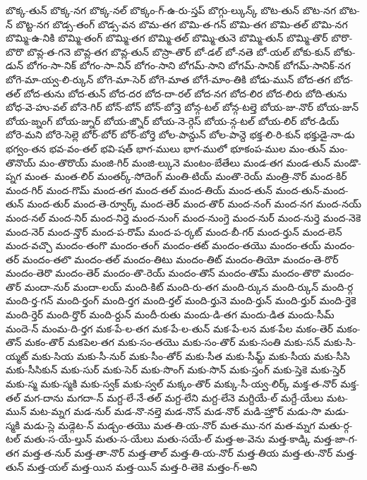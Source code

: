 {బొక్క-తున్
బొక్క-నగ
బొక్క-నల్
బొక్కం-గ్-ఉ-రు-స్తప్
బొగ్గు-ల్కున్క్
బొట-తున్
బొట-నగ
బొట-న్
బొట్ట-నగ
బొడ్స-తంగ్
బొడ్స-వన
బొమ-తగ
బొమి-త-గన్
బొమి-తగ
బొమి-తల్
బొమి-నగ
బొమ్మి-ఉ-నికి
బొమ్మి-తంగ్
బొమ్మి-తగ
బొమ్మి-తల్
బొమ్మి-తునె
బొమ్మి-తున్
బొమ్మి-తొర్
బొరొ-బొరొ
బొవ్ల-త-గనె
బొవ్ల-తగ
బొవ్ల-తున్
బొస్రా-తొర్
బో-డల్
బో-నతె
బో-యల్
బోకు-కున్
బోకు-డున్
బోగం-సా-నిక్
బోగం-సా-నిన్
బోగం-సాని
బోగమ్-సాని
బోగమ్-సానిక్
బోగమ్-సానిక్-నగ
బోగె-మా-య్వ-లి-ర్కున్
బోగె-మా-సెర్
బోగె-మాత
బోగే-మాం-తికి
బోడు-మున్
బోద-తగ
బోద-తల్
బోద-తును
బోద-తున్
బోద-దర
బోద-దా-రల్
బోద-నగ
బోద-లిర
బోద-లిరు
బోది-తును
బోధ-వె-హు-వల్
బోనె-గిర్
బోన్-బోన్
బోన్-బోన్తె
బోన్గ-టల్
బోన్గ-టల్తె
బోయ-జు-నొర్
బోయ-జున్
బోయ-జ్నంగ్
బోయ-జ్నుర్
బోయ-జ్నొర్
బోయ-నె-ర్గెస్
బోయ-న్గ-టల్
బోయ-లిర్
బోర-డియ్
బోరె-మని
బోరె-సెల్లె
బోర్-బోర్
బోర్-బోర్తె
బోల-పాన్దున్
బోల-పాన్దె
భక్త-లి-రి-కున్
భక్తుడై-నా-డు
భగ్వం-తన
భవ-వం-తల్
భవి-షత్
భాగ-ములు
భాగ-ములో
భూకంప-ముల
మం-తున్
మం-తొనొయ్
మం-తొరొయ్
మంజి-గిర్
మంజి-ల్కునె
మంటం-బేతేలు
మండ-తగ
మండ-తున్
మండొ-ప్నగ
మంత-
మంత-లిర్
మంతర్క్-సోదెంగ్
మంతి-టియ్
మంతొ-రెయ్
మంత్రి-నొర్
మంద-కిర్
మంద-గిర్
మంద-గొమ్
మంద-తగ
మంద-తల్
మంద-తియ్
మంద-తున్
మంద-తున్-మంద-తున్
మంద-తుర్
మంద-తె-ర్వూర్క్
మంద-తెర్
మంద-తొర్
మంద-నంగ్
మంద-నగ
మంద-నయ్
మంద-నల్
మంద-నిర్
మంద-నిర్తె
మంద-నుంగ్
మంద-నుంగ్తె
మంద-నుర్
మంద-నుర్తె
మంద-నెకె
మంద-నెర్
మంద-న్తొర్
మంద-ప-రొమ్
మంద-ప-ర్కట్
మంద-బీ-గర్
మంద-ర్తున్
మంద-లెన్
మంద-వచ్చొ
మందం-తంగొ
మందం-తంగ్
మందం-తట్
మందం-తయొ
మందం-తయ్
మందం-తర్
మందం-తలొ
మందం-తల్
మందం-తిటు
మందం-తిట్
మందం-తియో
మందం-తె-రొర్
మందం-తెరొ
మందం-తెర్
మందం-తొ-రెయ్
మందం-తొన్
మందం-తొమ్
మందం-తొరొ
మందం-తొర్
మందా-నుర్
మందా-లయ్
మంది-కిట్
మంది-రు-తగ
మంది-ర్కున
మంది-ర్కున్
మంది-ర్గ
మంది-ర్త-గన్
మంది-ర్తంగ్
మంది-ర్తగ
మంది-ర్తల్
మంది-ర్తునె
మంది-ర్తున్
మంది-ర్తుర్
మంది-ర్తెకె
మంది-ర్తెర్
మంది-ర్తొర్
మంది-ర్దున్
మందీ-రుతు
మందు-డి-తగ
మందు-డిత
మందు-సీమ్
మందె-న్
మంమ-ది-ర్తగ
మక-పే-ల-తగ
మక-పే-ల-తున్
మక-పే-లన
మక-పేల
మకం-తెర్
మకం-తొన్
మకం-తొర్
మకపెల-తగ
మకు-సం-తయొ
మకు-సం-తొర్
మకు-సంతి
మకు-సన్
మకు-సి-య్మట్
మకు-సియ
మకు-సీ-నుర్
మకు-సీం-తోర్
మకు-సీత
మకు-సీమ్ట్
మకు-సీయ
మకు-సీసి
మకు-సీసికున్
మకు-సుర్
మకు-సెర్
మకు-సొంగ్
మకు-సొన్
మకు-స్తంగ్
మకు-స్తెకె
మకు-స్తెర్
మకు-స్మ
మకు-స్మకి
మకు-స్వక్
మకు-స్వల్
మక్కం-తొర్
మక్కు-సీ-య్వ-లిర్క్
మక్త-త-నొర్
మక్త-తల్
మగ-దాను
మగదా-న్
మగ్ద-లే-నే-తల్
మగ్ద-లేని
మగ్ద-లేనె
మగ్దియే-ల్
మగ్దే-యేలు
మట-మున్
మట-మ్నగ
మడ-నుర్
మడ-నొ-నల్తె
మడ-నొన్
మడ-నొర్
మడి-హ్తొర్
మడు-సొ
మడు-స్మకి
మడు-స్లె
మడ్గెట-న్
మడ్చం-తయొ
మత-తి-య-నొర్
మత-ము-నగ
మత-మ్నగ
మతు-ర్గ-టల్
మతు-స-యే-ల్తున్
మతు-స-యేలు
మతు-సయే-ల్
మత్త-అ-వెను
మత్త-కాడ్కి
మత్త-జా-గ-తగ
మత్త-త-నుర్
మత్త-తా-నొర్
మత్త-తాల్
మత్త-తి-య-నొర్
మత్త-తియ
మత్త-తు-నొర్
మత్త-తున్
మత్త-యల్
మత్త-యిన
మత్త-యిన్
మత్త-రి-తెకె
మత్తం-గ్-అని
}

